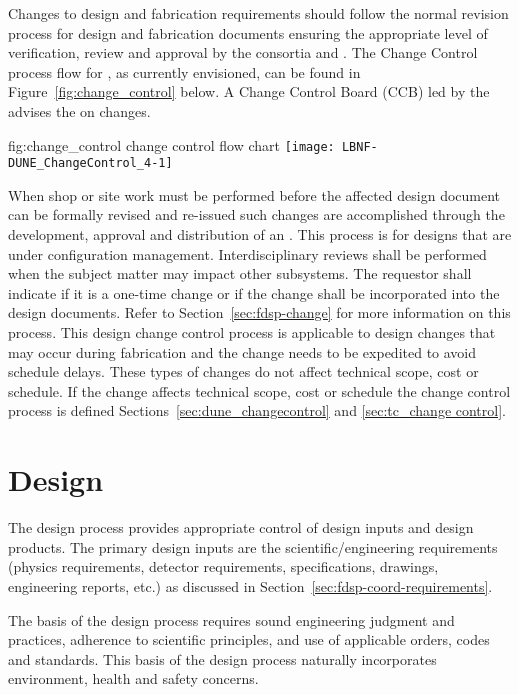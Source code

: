 Changes to design and fabrication requirements should follow the
normal revision process for design and fabrication documents ensuring
the appropriate level of verification, review and approval by the
consortia and . The Change Control process flow for
, as currently envisioned, can be found in
Figure~\ref{fig:change_control} below. A Change Control Board (CCB)
led by the  advises the  on changes.
\begin{dunefigure}{fig:change_control}
  { change control flow chart}
  \texttt{[image: LBNF-DUNE\_ChangeControl\_4-1]}
\end{dunefigure}


When shop or site work must be performed before the affected design
document can be formally revised and re-issued such changes are
accomplished through the development, approval and distribution of an
. This process is for designs that are
under configuration management. Interdisciplinary reviews shall be
performed when the  subject matter may impact other
subsystems. The  requestor shall indicate if it is a one-time
change or if the change shall be incorporated into the design
documents. Refer to Section~\ref{sec:fdsp-change} for more information on this
process.  This design change control process is applicable to design
changes that may occur during fabrication and the change needs to be
expedited to avoid schedule delays. These types of changes do not
affect technical scope, cost or schedule. If the change affects
technical scope, cost or schedule the change control process is defined
Sections~\ref{sec:dune_changecontrol} and \ref{sec:tc_change control}.

\section{Design}

The  design process provides appropriate control of design
inputs and design products. The primary design inputs are the
 scientific/engineering requirements (physics
requirements, detector requirements, specifications, drawings,
engineering reports, etc.) as discussed in
Section~\ref{sec:fdsp-coord-requirements}.

The basis of the design process requires sound engineering judgment
and practices, adherence to scientific principles, and use of
applicable orders, codes and standards. This basis of the design
process naturally incorporates environment, health and safety
concerns.

